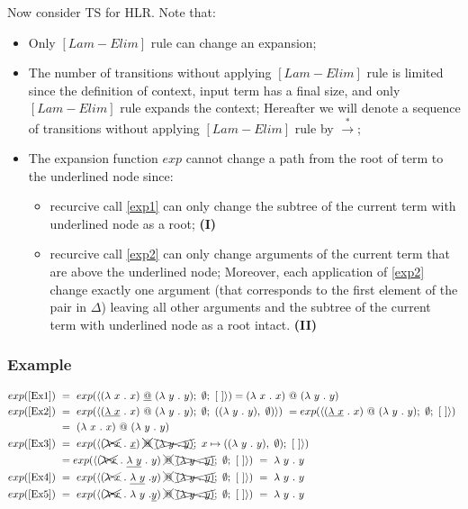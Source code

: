 \documentclass[a4paper, 10pt]{article}
\begin{document}
Now consider TS for HLR. Note that:
\begin{itemize}
\item Only $[Lam-Elim]$ rule can change an expansion;
\item The number of transitions without applying $[Lam-Elim]$ rule is limited since the definition of context, input term has a final size, and only $[Lam-Elim]$ rule expands the context; Hereafter we will denote a sequence of transitions without applying $[Lam-Elim]$ rule by $\overset{*}{\rightarrow}$;
\item The expansion function $exp$ cannot change a path from the root of term to the underlined node since:
  \begin{itemize}
  \item recurcive call \eqref{exp1} can only change the subtree of the current term with underlined node as a root; \hfill{\textbf{(I)}}
  \item recurcive call \eqref{exp2} can only change arguments of the current term that are above the underlined node; Moreover, each application of \eqref{exp2} change exactly one argument (that corresponds to the first element of the pair in $\Delta$) leaving all other arguments and the subtree of the current term with underlined node as a root intact. \hfill{\textbf{(II)}}
  \end{itemize}
\end{itemize}

\subsubsection{Example}
\begin{align*}
  exp (\textnormal{\eqref{Ex1}})\ & =\  exp (\langle (\lambda \ x\ .\ x)\ \underline{@}\ (\lambda \ y\ .\  y);\ \emptyset;\ [\ ]
  \rangle) =  (\lambda \ x\ .\ x)\ @\ (\lambda \ y\ .\  y) \\
  exp (\textnormal{\eqref{Ex2}})\ & =\ exp ( \langle (\underline{\lambda \ x}\ .\ x)\ @\ (\lambda \ y\ .\  y);\ \emptyset;\
  ((\lambda\ y\ .\ y),\ \emptyset)  \rangle)\ =
  exp ( \langle (\underline{\lambda \ x}\ .\ x)\ @\ (\lambda \ y\ .\  y);\ \emptyset;\
  [\ ]  \rangle)\ \\ & = \ (\lambda \ x\ .\ x)\ @\ (\lambda \ y\ .\  y) \\
  exp (\textnormal{\eqref{Ex3}})\ & =\ exp ( \langle (\xcancel{\lambda \ x}\ .\ \underline{x})\ \xcancel{@}\
  \xcancel{(\lambda \ y\ .\  y)};\ x \mapsto ((\lambda\ y\ .\ y),\ \emptyset);\ [\ ] \rangle ) \\
  & =  exp ( \langle (\xcancel{\lambda \ x}\ .\ \underline{\lambda\ y}\ .\ y)\ \xcancel{@}\
  \xcancel{(\lambda \ y\ .\  y)};\ \emptyset;\ [\ ] \rangle )\ =\ \lambda\ y\ .\ y\\
  exp (\textnormal{\eqref{Ex4}})\ & =\ exp (\langle (\xcancel{\lambda \ x}\ .\ \underline{\lambda \ y}\ . y )\
  \xcancel{@}\ \xcancel{(\lambda \ y\ .\  y)};\ \emptyset; \ [\ ] \rangle)\ =\ \lambda \ y\ .\ y \\
  exp (\textnormal{\eqref{Ex5}})\ & =\ exp (\langle (\xcancel{\lambda \ x}\ .\ \lambda \ y\ . \underline{y} )\
  \xcancel{@}\ \xcancel{(\lambda \ y\ .\  y)};\ \emptyset; \ [\ ] \rangle) \ = \ \lambda \ y\ .\ y
\end{align*}
\end{document}
